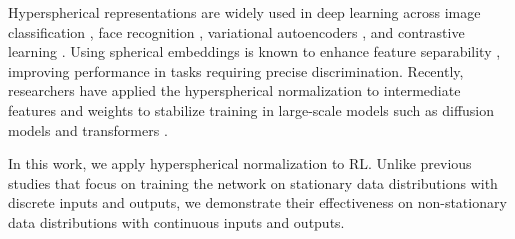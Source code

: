Hyperspherical representations are widely used in deep learning across image classification \citep{salimans2016weight_norm, liu2017hyper_conv}, face recognition \citep{wang2017normface, liu2017sphereface}, variational autoencoders \citep{xu2018spherical_vae}, and contrastive learning \citep{chen2020simclr}. Using spherical embeddings is known to enhance feature separability \citep{wang2020understanding}, improving performance in tasks requiring precise discrimination. Recently, researchers have applied the hyperspherical normalization to intermediate features and weights to stabilize training in large-scale models such as diffusion models \citep{karras2024analyzing_diffusion} and transformers \citep{loshchilov2024ngpt}.

In this work, we apply hyperspherical normalization to RL. Unlike previous studies that focus on training the network on stationary data distributions with discrete inputs and outputs, we demonstrate their effectiveness on non-stationary data distributions with continuous inputs and outputs.

